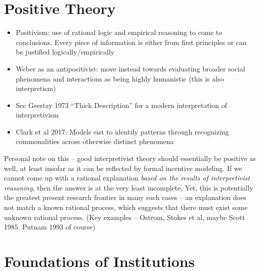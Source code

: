 \documentclass[12pt]{article}
\begin{document}
\section*{Positive Theory}


\begin{itemize}
    \item Positivism: use of rational logic and empirical reasoning to come to conclusions. Every piece of information is either from first principles or can be justified logically/empirically
    \item Weber as an antipositivist: move instead towards evaluating broader social phenomena and interactions as being highly humanistic (this is also interpretism)
    \item See Geertzy 1973 ``Thick Description'' for a modern interpretation of interpretivism
    \item Clark et al 2017: Models eist to identify patterns through recognizing commonalities across otherwise distinct phenomena
\end{itemize}


Personal note on this -- good interpretivist theory should essentially be positive as well, at least insofar as it can be reflected by formal incentive modeling. If we cannot come up with a rational explanation \emph{based on the results of interpretivist reasoning}, then the answer is at the very least incomplete. Yet, this is potentially the greatest present research frontier in many such cases -- an explanation does not match a known rational process, which suggests that there must exist some unknown rational process. (Key examples -- Ostrom, Stokes et al, maybe Scott 1985. Putnam 1993 of course)





\section*{Foundations of Institutions}
\end{document}

